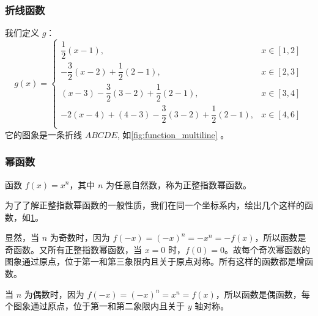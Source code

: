 \subsubsection{折线函数}
我们定义 $g$：
\[g(x)=\begin{cases}
    \dfrac{1}{2}(x-1), & x\in[1,2]\\
    -\dfrac{3}{2}(x-2)+\dfrac{1}{2}(2-1),& x\in [2,3]\\
    (x-3)-\dfrac{3}{2}(3-2)+\dfrac{1}{2}(2-1),& x\in [3,4]\\
  -2(x-4)+(4-3)-\dfrac{3}{2}(3-2)+\dfrac{1}{2}(2-1),& x\in [4,6]\\
\end{cases}\]
它的图象是一条折线 $ABCDE$, 如\cref{fig:function_multiline} 。


\subsubsection{幂函数}
函数 $f(x)=x^n$，其中 $n$ 为任意自然数，称为正整指数幂函数。

为了了解正整指数幂函数的一般性质，我们在同一个坐标系内，绘出几个这样的函数，如\cref{fig:function_power}。
\begin{figure}
  \caption{}\label{fig:function_power}
\end{figure}

显然，当 $n$ 为奇数时，因为 $f(-x)=(-x)^n=-x^n=-f(x)$，所以函数是奇函数。又所有正整指数幂函数，当 $x=0$ 时，$f(0)=0$。故每个奇次幂函数的图象通过原点，位于第一和第三象限内且关于原点对称。所有这样的函数都是增函数。

当 $n$ 为偶数时，因为 $f(-x)=(-x)^n=x^n=f(x)$，所以函数是偶函数，每个图象通过原点，位于第一和第二象限内且关于 $y$ 轴对称。

